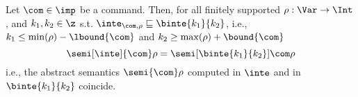 
\begin{theorem}
  Let \(\com\in \imp\) be a command. Then, for all finitely supported
  \(\rho : \Var \to \Int\), and \(k_1, k_2\in \z\) s.t.
  \(\inte_{\com,\rho} \sqsubseteq \binte{k_1}{k_2}\), i.e.,
  \(k_1 \leq \min(\rho) - \lbound{\com}\) and
  \(k_2 \geq \max(\rho) + \bound{\com}\)
  \begin{equation*}
    \semi[\inte]{\com}\rho = \semi[\binte{k_1}{k_2}]{\com}\rho
  \end{equation*}
  i.e., the abstract semantics \(\semi{\com} \rho\)
  computed in \(\inte\) and in \(\binte{k_1}{k_2}\) coincide.
\end{theorem}

